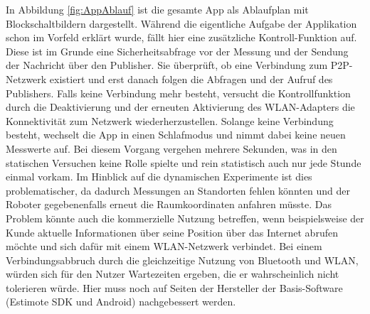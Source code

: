 In Abbildung \ref{fig:AppAblauf} ist die gesamte App als Ablaufplan mit Blockschaltbildern dargestellt. Während die eigentliche Aufgabe der Applikation schon im Vorfeld erklärt wurde, fällt hier eine zusätzliche Kontroll-Funktion auf. Diese ist im Grunde eine Sicherheitsabfrage vor der Messung und der Sendung der Nachricht über den Publisher. Sie überprüft, ob eine Verbindung zum P2P-Netzwerk existiert und erst danach folgen die Abfragen und der Aufruf des Publishers. Falls keine Verbindung mehr besteht, versucht die Kontrollfunktion durch die Deaktivierung und der erneuten Aktivierung des WLAN-Adapters die Konnektivität zum Netzwerk wiederherzustellen. Solange keine Verbindung besteht, wechselt die App in einen Schlafmodus und nimmt dabei keine neuen Messwerte auf. Bei diesem Vorgang vergehen mehrere Sekunden, was in den statischen Versuchen keine Rolle spielte und rein statistisch auch nur jede Stunde einmal vorkam. Im Hinblick auf die dynamischen Experimente ist dies problematischer, da dadurch Messungen an Standorten fehlen könnten und der Roboter gegebenenfalls erneut die Raumkoordinaten anfahren müsste. Das Problem könnte auch die kommerzielle Nutzung betreffen, wenn beispielsweise der Kunde aktuelle Informationen über seine Position über das Internet abrufen möchte und sich dafür mit einem WLAN-Netzwerk verbindet. Bei einem Verbindungsabbruch durch die gleichzeitige Nutzung von Bluetooth und WLAN, würden sich für den Nutzer Wartezeiten ergeben, die er wahrscheinlich nicht tolerieren würde. Hier muss noch auf Seiten der Hersteller der Basis-Software (Estimote SDK und Android) nachgebessert werden. 
